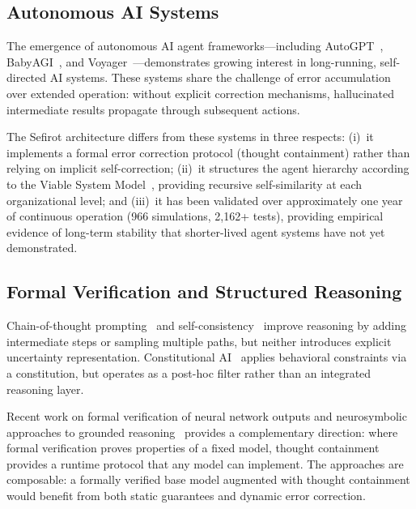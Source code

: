 \documentclass[11pt]{article}
\theoremstyle{definition}
\theoremstyle{remark}
\begin{document}
\subsection{Autonomous AI Systems}
\label{sec:related-autonomous}

The emergence of autonomous AI agent frameworks---including
AutoGPT~\cite{yang2023autogpt}, BabyAGI~\cite{nakajima2023babyagi},
and Voyager~\cite{wang2023voyager}---demonstrates growing interest in
long-running, self-directed AI systems.  These systems share the challenge
of error accumulation over extended operation: without explicit correction
mechanisms, hallucinated intermediate results propagate through subsequent
actions.

The Sefirot architecture differs from these systems in three respects:
(i)~it implements a formal error correction protocol (thought containment)
rather than relying on implicit self-correction; (ii)~it structures the
agent hierarchy according to the Viable System Model~\cite{beer1972},
providing recursive self-similarity at each organizational level; and
(iii)~it has been validated over approximately one year of continuous
operation (966 simulations, 2,162+ tests), providing empirical evidence
of long-term stability that shorter-lived agent systems have not yet
demonstrated.

\subsection{Formal Verification and Structured Reasoning}
\label{sec:related-formal}

Chain-of-thought prompting~\cite{wei2022cot} and
self-consistency~\cite{wang2023self} improve reasoning by adding intermediate
steps or sampling multiple paths, but neither introduces explicit uncertainty
representation.  Constitutional AI~\cite{bai2022constitutional} applies
behavioral constraints via a constitution, but operates as a post-hoc filter
rather than an integrated reasoning layer.

Recent work on formal verification of neural network outputs and
neurosymbolic approaches to grounded reasoning~\cite{pan2023logic} provides
a complementary direction: where formal verification proves properties of a
fixed model, thought containment provides a runtime protocol that any model
can implement.  The approaches are composable: a formally verified base model
augmented with thought containment would benefit from both static guarantees
and dynamic error correction.
\end{document}
